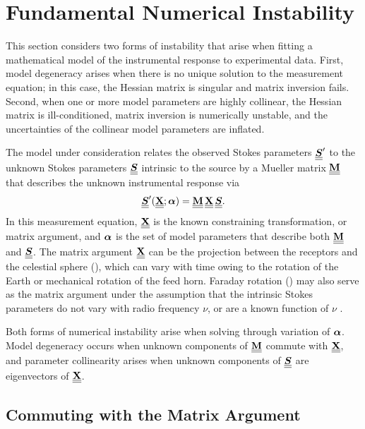 \section{Fundamental Numerical Instability}
\label{app:instability}

This section considers two forms of instability that arise when fitting a mathematical model of the instrumental response to experimental data.  
%
%
First, model degeneracy arises when there is no unique solution to the measurement equation; in this case, the Hessian matrix is singular and matrix inversion fails.
%
Second, when one or more model parameters are highly collinear, the Hessian matrix is ill-conditioned, matrix inversion is numerically unstable, and the uncertainties of the collinear model parameters are inflated.

The model under consideration relates the observed Stokes parameters $\underline{\underline{\mbox{\boldmath $S$}}}'$ to the unknown Stokes parameters $\underline{\underline{\mbox{\boldmath $S$}}}$ intrinsic to the source by a Mueller matrix $\underline{\underline{{\bf M}}}$ that describes the unknown instrumental response via
%
\begin{equation}
\underline{\underline{\mbox{\boldmath $S$}}}'(\underline{\underline{{\bf X}}}; \mbox{\boldmath $\alpha$}) = \underline{\underline{{\bf M}}} \, \underline{\underline{{\bf X}}} \, \underline{\underline{\mbox{\boldmath $S$}}}.
\label{eqn:generic_measurement_equation}
\end{equation}
%
In this measurement equation, $\underline{\underline{{\bf X}}}$ is the known constraining transformation, or matrix argument, and $\mbox{\boldmath $\alpha$}$ is the set of model parameters that describe both $\underline{\underline{{\bf M}}}$ and $\underline{\underline{\mbox{\boldmath $S$}}}$.
%
The matrix argument $\underline{\underline{{\bf X}}}$ can be the projection between the receptors and the celestial sphere (), which can vary with time owing to the rotation of the Earth or mechanical rotation of the feed horn.
%
Faraday rotation () may also serve as the matrix argument under the assumption that the intrinsic Stokes parameters do not vary with radio frequency $\nu$, or are a known function of $\nu$ \citep[e.g.,][]{es04}.


Both forms of numerical instability arise when solving  through variation of $\mbox{\boldmath $\alpha$}$. Model degeneracy occurs when unknown components of $\underline{\underline{{\bf M}}}$ commute with $\underline{\underline{{\bf X}}}$, and parameter collinearity arises when unknown components of $\underline{\underline{\mbox{\boldmath $S$}}}$ are eigenvectors of $\underline{\underline{{\bf X}}}$.

\subsection{Commuting with the Matrix Argument}
\label{app:degeneracy}

